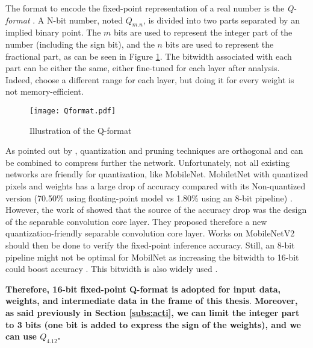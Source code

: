 The format to encode the fixed-point representation of a real number is the \textit{Q-format} \cite{ward_real-time_2001}. A N-bit number, noted $Q_{m.n}$, is divided into two parts separated by an implied binary point. The $m$ bits are used to represent the integer part of the number (including the sign bit), and the $n$ bits are used to represent the fractional part, as can be seen in Figure \ref{fig:Qformat}. The bitwidth associated with each part can be either the same, either fine-tuned for each layer after analysis. Indeed, \textcite{qiu_going_2016, yin_high_2018} choose a different range for each layer, but doing it for every weight is not memory-efficient.
%
\begin{figure}[H]
    \centering
    \texttt{[image: Qformat.pdf]}
    \caption{Illustration of the Q-format}
    \label{fig:Qformat}
\end{figure}

As pointed out by \textcite{han_deep_2016}, quantization and pruning techniques are orthogonal and can be combined to compress further the network. Unfortunately, not all existing networks are friendly for quantization, like MobileNet. MobiletNet with quantized pixels and weights has a large drop of accuracy compared with its Non-quantized version (70.50\% using floating-point model vs 1.80\% using an 8-bit pipeline) \cite{sheng_quantization-friendly_2018}. However, the work of \textcite{sheng_quantization-friendly_2018} showed that the source of the accuracy drop was the design of the separable convolution core layer. They proposed therefore a new quantization-friendly separable convolution core layer. Works on MobileNetV2 should then be done to verify the fixed-point inference accuracy. Still, an 8-bit pipeline might not be optimal for MobilNet as increasing the bitwidth to 16-bit could boost accuracy \cite{cheng_recent_2018}. This bitwidth is also widely used \cite{huimin_li_high_2016, bai_cnn_2018}. 

\textbf{Therefore, 16-bit fixed-point Q-format is adopted for input data, weights, and intermediate data in the frame of this thesis}. \textbf{Moreover, as said previously in Section \ref{subs:acti}, we can limit the integer part to 3 bits (one bit is added to express the sign of the weights), and we can use $Q_{4.12}$.}
